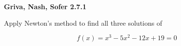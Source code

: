 \textbf{Griva, Nash, Sofer 2.7.1}

Apply Newton's method to find all three solutions of 

$$
f(x) = x^3 - 5x^2 - 12x + 19 = 0
$$

\begin{solution}
  \ \\
\end{solution}
